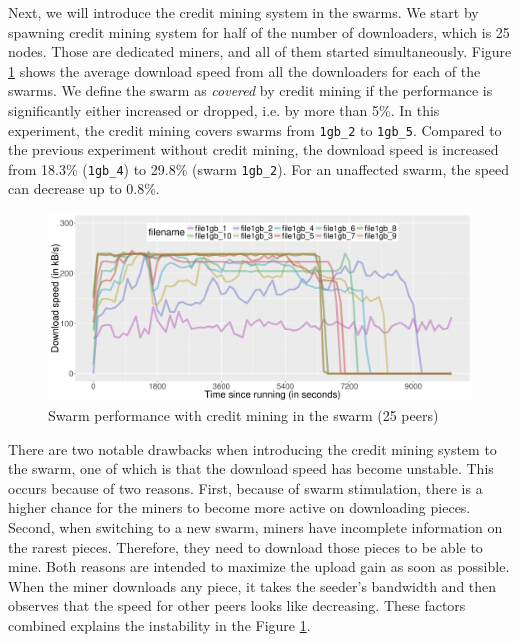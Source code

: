 Next, we will introduce the credit mining system in the swarms. We start by spawning credit mining system for half of the number of downloaders, which is 25 nodes. Those are dedicated miners, and all of them started simultaneously. Figure \ref{fig:swarmcm25perf} shows the average download speed from all the downloaders for each of the swarms. We define the swarm as \textit{covered} by credit mining if the performance is significantly either increased or dropped, i.e. by more than 5\%. In this experiment, the credit mining covers swarms from \texttt{1gb\_2} to \texttt{1gb\_5}. Compared to the previous experiment without credit mining, the download speed is increased from 18.3\% (\texttt{1gb\_4}) to 29.8\% (swarm \texttt{1gb\_2}). For an unaffected swarm, the speed can decrease up to 0.8\%.

\begin{figure}[h!]
	\centering
	\includegraphics[width=\textwidth]{pics/results/swperf_sc2_25.png}
	\caption{Swarm performance with credit mining in the swarm (25 peers)}
	\label{fig:swarmcm25perf}
\end{figure}

There are two notable drawbacks when introducing the credit mining system to the swarm, one of which is that the download speed has become unstable. This occurs because of two reasons. First, because of swarm stimulation, there is a higher chance for the miners to become more active on downloading pieces. Second, when switching to a new swarm, miners have incomplete information on the rarest pieces. Therefore, they need to download those pieces to be able to mine. Both reasons are intended to maximize the upload gain as soon as possible. When the miner downloads any piece, it takes the seeder's bandwidth and then observes that the speed for other peers looks like decreasing. These factors combined explains the instability in the Figure \ref{fig:swarmcm25perf}.

